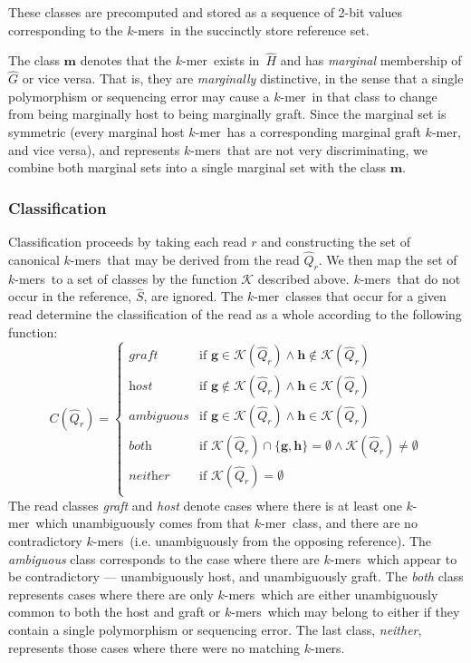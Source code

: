 \documentclass{bioinfo}
\newcommand{\kmer}{$k$-mer{}}
\newcommand{\kmers}{$k$-mers{}}
\begin{document}
These classes are precomputed and stored as a sequence of 2-bit values
corresponding to the \kmers\ in the succinctly store reference set.

The class $\textbf{m}$ denotes that the \kmer\ 
exists in~$\hat{H}$ and has \textit{marginal} membership of $\hat{G}$
or vice versa.  That is, they are \textit{marginally} distinctive,
in the sense that a single polymorphism or sequencing error may cause
a \kmer\ in that class to change from being marginally host to being
marginally graft.  Since the marginal set is symmetric (every marginal
host \kmer\ has a corresponding marginal graft \kmer, and vice versa),
and represents \kmers\ that are not very discriminating, we combine
both marginal sets into a single marginal set with the class $\textbf{m}$.

\subsubsection{Classification}
\label{sec:class}

Classification proceeds by taking each read $r$ and constructing the set
of canonical \kmers\ that may be derived from the read $\hat{Q}_r$. We
then map the set of \kmers\ to a set of classes by the function $\mathcal{K}$
described above.
\kmers\ that do not occur in the reference, $\hat{S}$, are ignored.
The \kmer\ classes that occur for a given read determine the classification
of the read as a whole according to the following function:
$$
C(\hat{Q}_r) =
\left\{
\begin{array}{ll}
    \textit{graft} & \mbox{if } \textbf{g} \in \mathcal{K}(\hat{Q}_r) \wedge \textbf{h} \notin \mathcal{K}(\hat{Q}_r) \\
    \textit{host} & \mbox{if } \textbf{g} \notin \mathcal{K}(\hat{Q}_r) \wedge \textbf{h} \in \mathcal{K}(\hat{Q}_r) \\
    \textit{ambiguous} & \mbox{if } \textbf{g} \in \mathcal{K}(\hat{Q}_r) \wedge \textbf{h} \in \mathcal{K}(\hat{Q}_r) \\
    \textit{both} & \mbox{if } \mathcal{K}(\hat{Q}_r) \cap \{ \textbf{g}, \textbf{h} \} = \emptyset \wedge \mathcal{K}(\hat{Q}_r) \ne \emptyset \\
    \textit{neither} & \mbox{if } \mathcal{K}(\hat{Q}_r) = \emptyset \\
\end{array}
\right.
$$
The read classes \textit{graft}
and \textit{host} denote cases where there is at least one \kmer\
which unambiguously comes from that \kmer\ class, and there are no
contradictory \kmers\ (i.e. unambiguously from the opposing reference).
The \textit{ambiguous} class corresponds to the case where there
are \kmers\ which appear to be contradictory --- unambiguously host,
and unambiguously graft. The \textit{both} class represents cases where
there are only \kmers\ which are either unambiguously common to both the
host and graft or \kmers\ which may belong to either if they contain a
single polymorphism or sequencing error. The last class, \textit{neither},
represents those cases where there were no matching \kmers.
\end{document}
